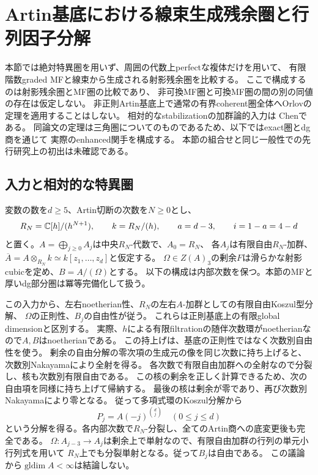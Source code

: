 \section{Artin基底における線束生成残余圏と行列因子分解}
\label{am:sec:comparison}

本節では絶対特異圏を用いず、周囲の代数上perfectな複体だけを用いて、
有限階数graded MFと線束から生成される射影残余圏を比較する。
ここで構成するのは射影残余圏とMF圏の比較であり、
非可換MF圏と可換MF圏の間の別の同値の存在は仮定しない。
非正則Artin基底上で通常の有界coherent圏全体へOrlovの定理を適用することはしない。
相対的なstabilizationの加群論的入力は
Chen\cite[Theorem 2.10, Corollary 2.11, Theorem 7.2]{AMChen}である。
同論文の定理は三角圏についてのものであるため、以下ではexact圏とdg商を通じて
実際のenhanced関手を構成する。
本節の組合せと同じ一般性での先行研究上の初出は未確認である。

\subsection{入力と相対的な特異圏}

変数の数を$d\ge5$、Artin切断の次数を$N\ge0$とし、
\[
 R_N=\mathbb C[h]/(h^{N+1}),\qquad k=R_N/(h),\qquad
 a=d-3,\qquad i=1-a=4-d
\]
と置く。$A=\bigoplus_{j\ge0}A_j$は中央$R_N$-代数で、$A_0=R_N$、
各$A_j$は有限自由$R_N$-加群、
$\overline A=A\otimes_{R_N}k\simeq k[z_1,\ldots,z_d]$と仮定する。
$\Omega\in Z(A)_3$の剰余$F$は滑らかな射影cubicを定め、$B=A/(\Omega)$とする。
以下の構成は内部次数を保つ。本節のMFと厚いdg部分圏は冪等完備化して扱う。

この入力から、左右noetherian性、$R_N$の左右$A$-加群としての有限自由Koszul型分解、
$\Omega$の正則性、$B_j$の自由性が従う。
これらは正則基底上の有限global dimensionと区別する。
実際、$h$による有限filtrationの随伴次数環がnoetherianなので$A,B$はnoetherianである。
この持上げは、基底の正則性ではなく次数別自由性を使う。
剰余の自由分解の零次項の生成元の像を同じ次数に持ち上げると、
次数別Nakayamaにより全射を得る。
各次数で有限自由加群への全射なので分裂し、核も次数別有限自由である。
この核の剰余を正しく計算できるため、次の自由項を同様に持ち上げて帰納する。
最後の核は剰余が零であり、再び次数別Nakayamaにより零となる。
従って多項式環のKoszul分解から
\begin{equation}\label{am:eq:relative-koszul}
 P_j=A(-j)^{\binom dj}\quad(0\le j\le d)
\end{equation}
という分解を得る。各内部次数で$R_N$-分裂し、全てのArtin商への底変更後も完全である。
$\Omega:A_{j-3}\to A_j$は剰余上で単射なので、有限自由加群の行列の単元小行列式を用いて
$R_N$上でも分裂単射となる。従って$B_j$は自由である。
この議論から$\operatorname{gldim}A<\infty$は結論しない。

